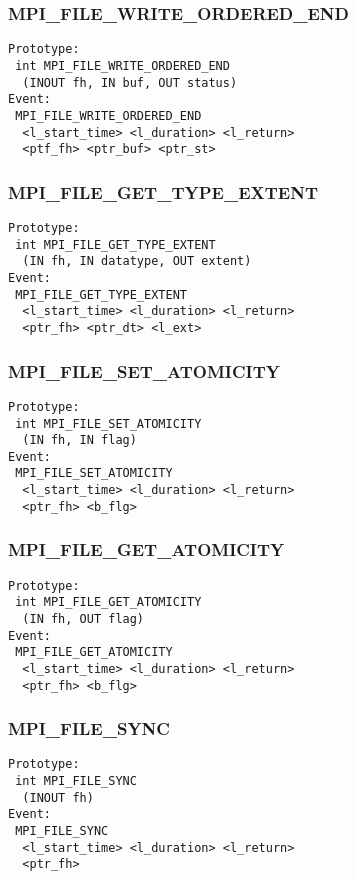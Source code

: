 \documentclass{article}
\begin{document}
\subsubsection{MPI\_FILE\_WRITE\_ORDERED\_END}
\label{sec:MPIFILEWRITEORDEREDEND}
\begin{verbatim}
Prototype:
 int MPI_FILE_WRITE_ORDERED_END
  (INOUT fh, IN buf, OUT status)
Event:
 MPI_FILE_WRITE_ORDERED_END 
  <l_start_time> <l_duration> <l_return>
  <ptf_fh> <ptr_buf> <ptr_st>
\end{verbatim}

\subsubsection{MPI\_FILE\_GET\_TYPE\_EXTENT}
\label{sec:MPIFILEGETTYPEEXTENT}
\begin{verbatim}
Prototype:
 int MPI_FILE_GET_TYPE_EXTENT
  (IN fh, IN datatype, OUT extent)
Event:
 MPI_FILE_GET_TYPE_EXTENT 
  <l_start_time> <l_duration> <l_return>
  <ptr_fh> <ptr_dt> <l_ext>
\end{verbatim}

\subsubsection{MPI\_FILE\_SET\_ATOMICITY}
\label{sec:MPIFILESETATOMICITY}
\begin{verbatim}
Prototype:
 int MPI_FILE_SET_ATOMICITY
  (IN fh, IN flag)
Event:
 MPI_FILE_SET_ATOMICITY 
  <l_start_time> <l_duration> <l_return>
  <ptr_fh> <b_flg>
\end{verbatim}

\subsubsection{MPI\_FILE\_GET\_ATOMICITY}
\label{sec:MPIFILEGETATOMICITY}
\begin{verbatim}
Prototype:
 int MPI_FILE_GET_ATOMICITY
  (IN fh, OUT flag)
Event:
 MPI_FILE_GET_ATOMICITY 
  <l_start_time> <l_duration> <l_return>
  <ptr_fh> <b_flg>
\end{verbatim}

\subsubsection{MPI\_FILE\_SYNC}
\label{sec:MPIFILESYNC}
\begin{verbatim}
Prototype:
 int MPI_FILE_SYNC
  (INOUT fh)
Event:
 MPI_FILE_SYNC 
  <l_start_time> <l_duration> <l_return>
  <ptr_fh>
\end{verbatim}
\end{document}
